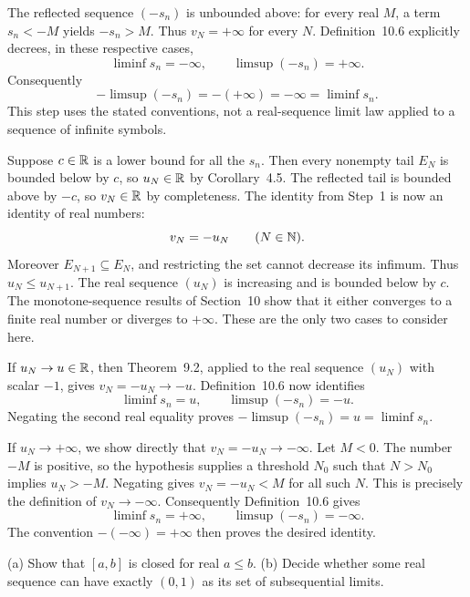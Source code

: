 The reflected sequence $(-s_n)$ is unbounded above: for every real
$M$, a term $s_n<-M$ yields $-s_n>M$.
Thus $v_N=+\infty$ for every $N$.
Definition~10.6 explicitly decrees, in these respective cases,
\[
 \liminf s_n=-\infty,
 \qquad \limsup(-s_n)=+\infty.
\]
Consequently
\[
 -\limsup(-s_n)=-(+\infty)=-\infty=\liminf s_n.
\]
This step uses the stated conventions, not a real-sequence limit
law applied to a sequence of infinite symbols.

Suppose $c\in\mathbb{R}$ is a lower bound for all the $s_n$.
Then every nonempty tail $E_N$ is bounded below by $c$, so
$u_N\in\mathbb{R}$ by Corollary~4.5. The reflected tail is bounded above
by $-c$, so $v_N\in\mathbb{R}$ by completeness. The identity from Step~1
is now an identity of real numbers:
\[
 v_N=-u_N\qquad(N\in\mathbb{N}).
\]
Moreover $E_{N+1}\subseteq E_N$, and restricting the set cannot
decrease its infimum. Thus $u_N\le u_{N+1}$.
The real sequence $(u_N)$ is increasing and is bounded below by $c$.
The monotone-sequence results of Section~10 show that it either
converges to a finite real number or diverges to $+\infty$.
These are the only two cases to consider here.

If $u_N\to u\in\mathbb{R}$, then Theorem~9.2, applied to the real
sequence $(u_N)$ with scalar $-1$, gives $v_N=-u_N\to-u$.
Definition~10.6 now identifies
\[
 \liminf s_n=u,
 \qquad \limsup(-s_n)=-u.
\]
Negating the second real equality proves
$-\limsup(-s_n)=u=\liminf s_n$.

If $u_N\to+\infty$, we show directly that $v_N=-u_N\to-\infty$.
Let $M<0$. The number $-M$ is positive, so the hypothesis supplies
a threshold $N_0$ such that $N>N_0$ implies $u_N>-M$.
Negating gives $v_N=-u_N<M$ for all such $N$.
This is precisely the definition of $v_N\to-\infty$.
Consequently Definition~10.6 gives
\[
 \liminf s_n=+\infty,
 \qquad \limsup(-s_n)=-\infty.
\]
The convention $-(-\infty)=+\infty$ then proves the desired identity.


\goal \textup{(a)} Show that $[a,b]$ is closed for real $a\le b$.
\textup{(b)} Decide whether some real sequence can have exactly
$(0,1)$ as its set of subsequential limits.

